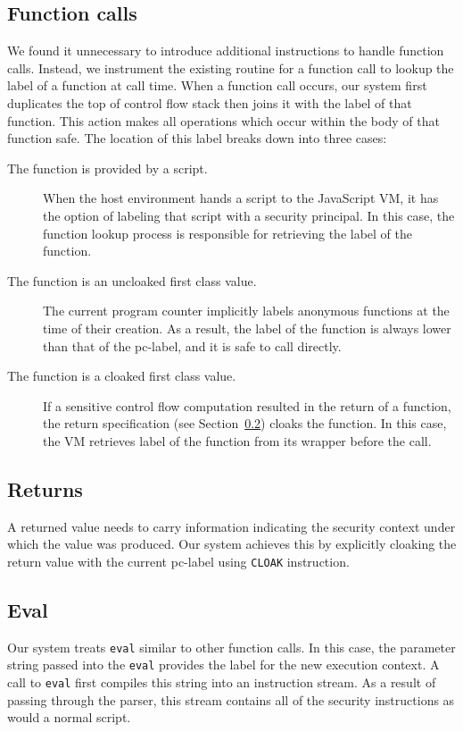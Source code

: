 \documentclass[preprint]{sigplanconf}
\begin{document}
\subsection{Function calls}
\label{sec:function-calls}
We found it unnecessary to introduce additional instructions to handle function calls.
Instead, we instrument the existing routine for a function call to lookup the label of a function at call time.
When a function call occurs, our system first duplicates the top of control flow stack then joins it with the label of that function.
This action makes all operations which occur within the body of that function safe.
The location of this label breaks down into three cases:
\begin{description}
 \item [The function is provided by a script.]
  When the host environment hands a script to the JavaScript VM, it has the option of labeling that script with a security principal.
  In this case, the function lookup process is responsible for retrieving the label of the function.
 \item [The function is an uncloaked first class value.]
  The current program counter implicitly labels anonymous functions at the time of their creation.
  As a result, the label of the function is always lower than that of the pc-label, and it is safe to call directly.
 \item [The function is a cloaked first class value.]
  If a sensitive control flow computation resulted in the return of a function, the return specification (see Section~\ref{sec:returns}) cloaks the function.
  In this case, the VM retrieves label of the function from its wrapper before the call.
\end{description}

\subsection{Returns}
\label{sec:returns}
A returned value needs to carry information indicating the security context under which the value was produced.
Our system achieves this by explicitly cloaking the return value with the current pc-label using \texttt{CLOAK} instruction.

\subsection{Eval}
\label{sec:eval}
Our system treats \texttt{eval} similar to other function calls.
In this case, the parameter string passed into the \texttt{eval} provides the label for the new execution context.
A call to \texttt{eval} first compiles this string into an instruction stream.
As a result of passing through the parser, this stream contains all of the security instructions as would a normal script.
\end{document}
